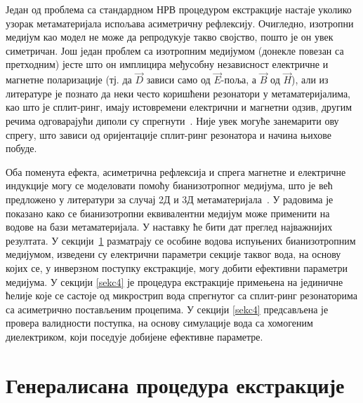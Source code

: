 Један од проблема са стандардном НРВ процедуром екстракције настаје уколико узорак метаматеријала испољава асиметричну рефлексију. Очигледно, изотропни медијум као модел не може да репродукује такво својство, пошто је он увек симетричан. Још један проблем са изотропним медијумом (донекле повезан са претходним) јесте што он имплицира међусобну независност електричне и магнетне поларизације (тј. да $\vec{D}$ зависи само од $\vec{E}$-поља, а $\vec{B}$ од $\vec{H}$), али из литературе је познато да неки често коришћени резонатори у метаматеријалима, као што је сплит-ринг, имају истовремени електрични и магнетни одзив, другим речима одговарајући диполи су спрегнути~\cite{marques}. Није увек могуће занемарити ову спрегу, што зависи од оријентације сплит-ринг резонатора и начина њихове побуде.

Оба поменута ефекта, асиметрична рефлексија и спрега магнетне и електричне индукције могу се моделовати помоћу бианизотропног медијума, што је већ предложено у литератури за случај 2Д и 3Д метаматеријала~\cite{chen:05,kriegler,shalaev}. У радовима \cite{bian_mtt,bian_physcr} је показано како се бианизотропни еквивалентни медијум може применити на водове на бази метаматеријала. У наставку ће бити дат преглед најважнијих резултата. У секцији~\ref{sekc2} разматрају се особине водова испуњених бианизотропним медијумом, изведени су електрични параметри секције таквог вода, на основу којих се, у инверзном поступку екстракције, могу добити ефективни параметри медијума. У секцији \ref{sekc4} је процедура екстракције примењена на јединичне ћелије које се састоје од микрострип вода спрегнутог са сплит-ринг резонаторима са асиметрично постављеним процепима. У секцији \ref{sekc4} предсављена је провера валидности поступка, на основу симулације вода са хомогеним диелектриком, који поседује добијене ефективне параметре.


\section{Генералисана процедура екстракције}\label{sekc2}
